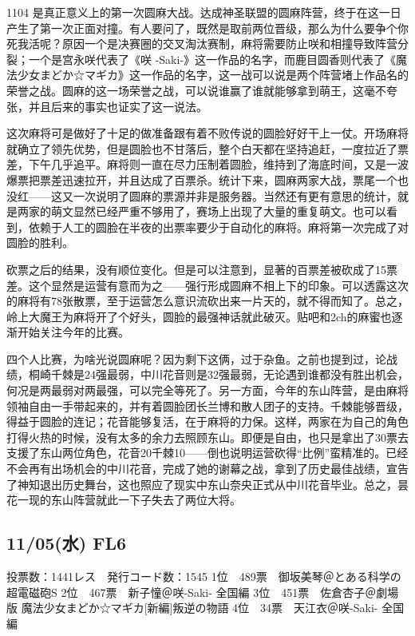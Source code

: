 1104 是真正意义上的第一次圆麻大战。达成神圣联盟的圆麻阵营，终于在这一日产生了第一次正面对撞。有人要问了，既然是取前两位晋级，那么为什么要争个你死我活呢？原因一个是决赛圈的交叉淘汰赛制，麻将需要防止咲和相撞导致阵营分裂；一个是宫永咲代表了《咲 -Saki-》这一作品的名字，而鹿目圆香则代表了《魔法少女まどか☆マギカ》这一作品的名字，这一战可以说是两个阵营堵上作品名的荣誉之战。圆麻的这一场荣誉之战，可以说谁赢了谁就能够拿到萌王，这毫不夸张，并且后来的事实也证实了这一说法。

这次麻将可是做好了十足的做准备跟有着不败传说的圆脸好好干上一仗。开场麻将就确立了领先优势，但是圆脸也不甘落后，整个白天都在坚持追赶，一度拉近了票差，下午几乎追平。麻将则一直在尽力压制着圆脸，维持到了海底时间，又是一波爆票把票差迅速拉开，并且达成了百票杀。统计下来，圆麻两家大战，票尾一个也没红——这又一次说明了圆麻的票源并非是服务器。当然还有更有意思的统计，就是两家的萌文显然已经严重不够用了，赛场上出现了大量的重复萌文。也可以看到，依赖于人工的圆脸在半夜的出票率要少于自动化的麻将。麻将第一次完成了对圆脸的胜利。

砍票之后的结果，没有顺位变化。但是可以注意到，显著的百票差被砍成了15票差。这个显然是运营有意而为之——强行形成圆麻不相上下的印象。可以透露这次的麻将有78张散票，至于运营怎么意识流砍出来一片天的，就不得而知了。总之，岭上大魔王为麻将开了个好头，圆脸的最强神话就此破灭。贴吧和2ch的麻蜜也逐渐开始关注今年的比赛。

四个人比赛，为啥光说圆麻呢？因为剩下这俩，过于杂鱼。之前也提到过，论战绩，桐崎千棘是24强最弱，中川花音则是32强最弱，无论遇到谁都没有胜出机会，何况是两最弱对两最强，可以完全等死了。另一方面，今年的东山阵营，是由麻将领袖自由一手带起来的，并有着圆脸团长兰博和散人团子的支持。千棘能够晋级，得益于圆脸的连记；花音能够复活，在于麻将的力保。这样，两家在为自己的角色打得火热的时候，没有太多的余力去照顾东山。即便是自由，也只是拿出了30票去支援了东山两位角色，花音20千棘10——倒也说明运营砍得“比例”蛮精准的。已经不会再有出场机会的中川花音，完成了她的谢幕之战，拿到了历史最佳战绩，宣告了神知退出历史舞台，这也照应了现实中东山奈央正式从中川花音毕业。总之，昙花一现的东山阵营就此一下子失去了两位大将。

\subsection{11/05(水) FL6}

	投票数：1441レス　発行コード数：1545
	1位　489票　御坂美琴＠とある科学の超電磁砲S
	2位　467票　新子憧＠咲-Saki- 全国編
	3位　451票　佐倉杏子＠劇場版 魔法少女まどか☆マギカ[新編]叛逆の物語
	4位　34票　天江衣＠咲-Saki- 全国編


